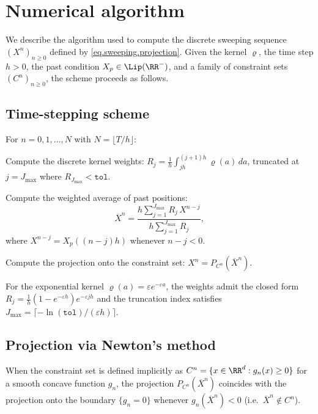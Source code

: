 \documentclass[]{jnsao}
\newcommand{\kernel}{\varrho}
\begin{document}
 
%
 

\section{Numerical algorithm}\label{sec:numerics}

We describe the algorithm used to compute the discrete sweeping sequence $(X^n)_{n\geq 0}$
defined by \eqref{eq.sweeping.projection}.
Given the kernel $\kernel$, the time step $h>0$,
the past condition $X_p \in \Lip(\RR^-)$,
and a family of constraint sets $(C^n)_{n\geq 0}$,
the scheme proceeds as follows.

\subsection{Time-stepping scheme}

For $n = 0, 1, \ldots, N$ with $N = \lfloor T/h \rfloor$:
\begin{compactenum}[1)]
	\item Compute the discrete kernel weights:
	$R_j = \frac{1}{h}\int_{jh}^{(j+1)h} \kernel(a)\, da$,
	truncated at $j = J_{\max}$ where $R_{J_{\max}} < \texttt{tol}$.
	\item Compute the weighted average of past positions:
	\begin{equation}\label{eq.num.xbar}
		\overline{X}^n = \frac{h \sum_{j=1}^{J_{\max}} R_j\, X^{n-j}}{h \sum_{j=1}^{J_{\max}} R_j},
	\end{equation}
	where $X^{n-j} = X_p((n-j)h)$ whenever $n-j < 0$.
	\item Compute the projection onto the constraint set:
	$X^n = P_{C^n}(\overline{X}^n)$.
\end{compactenum}

\noindent For the exponential kernel $\kernel(a) = \varepsilon e^{-\varepsilon a}$,
the weights admit the closed form
$R_j = \frac{1}{h}(1 - e^{-\varepsilon h}) e^{-\varepsilon j h}$
and the truncation index satisfies $J_{\max} = \lceil -\ln(\texttt{tol})/(\varepsilon h) \rceil$.

\subsection{Projection via Newton's method}

When the constraint set is defined implicitly as $C^n = \{x \in \RR^d : g_n(x) \geq 0\}$
for a smooth concave function $g_n$, the projection $P_{C^n}(\overline{X}^n)$
coincides with the projection onto the boundary $\{g_n = 0\}$ whenever
$g_n(\overline{X}^n) < 0$ (i.e.\ $\overline{X}^n \notin C^n$).
\end{document}
